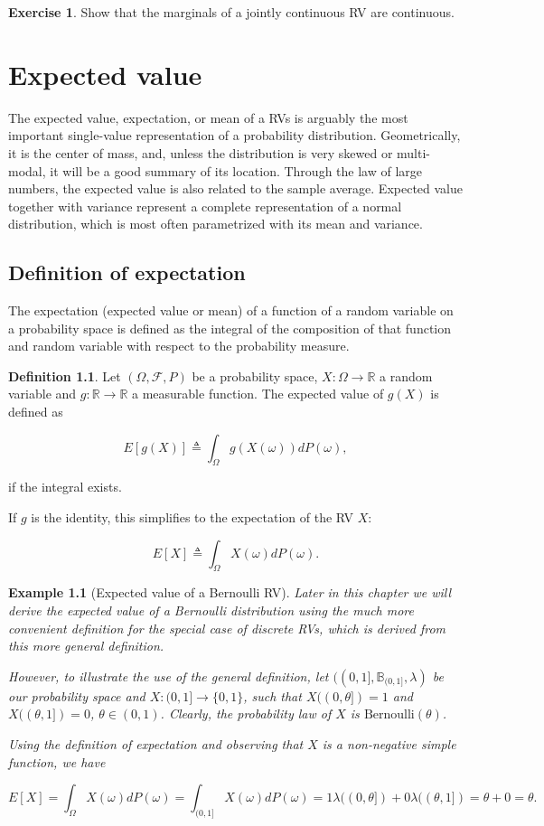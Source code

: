 \documentclass{book}
\theoremstyle{plain}%
\newtheorem{prototheorem}{Example}[section]
\newenvironment{cexample}
   {\colorlet{shadecolor}{gray!10}\begin{shaded}\begin{prototheorem}}
   {\end{prototheorem}\end{shaded}}
\theoremstyle{definition}
\newtheorem{definition}{Definition}[section]
\newtheorem{exercise}{Exercise}[chapter]
\newlength{\arrow}
\begin{document}
\begin{exercise}
Show that the marginals of a jointly continuous RV are continuous.
\end{exercise}

\chapter{Expected value}

The expected value, expectation, or mean of a RVs is arguably the most important single-value representation of a probability distribution. Geometrically, it is the center of mass, and, unless the distribution is very skewed or multi-modal, it will be a good summary of its location. Through the law of large numbers, the expected value is also related to the sample average. Expected value together with variance represent a complete representation of a normal distribution, which is most often parametrized with its mean and variance.

\section{Definition of expectation}

The expectation (expected value or mean) of a function of a random variable on a probability space is defined as the integral of the composition of that function and random variable with respect to the probability measure.

\begin{definition}
Let $(\Omega, \mathcal{F}, P)$ be a probability space, $X: \Omega \rightarrow \mathbb{R}$ a random variable and $g: \mathbb{R} \rightarrow \mathbb{R}$ a measurable function. The expected value of $g(X)$ is defined as

$$E[g(X)] \triangleq \int_{\Omega} g(X(\omega))dP(\omega),$$

if the integral exists.

If $g$ is the identity, this simplifies to the expectation of the RV $X$:

$$E[X] \triangleq \int_{\Omega} X(\omega)dP(\omega).$$
\end{definition}

\begin{cexample}[Expected value of a Bernoulli RV]
Later in this chapter we will derive the expected value of a Bernoulli distribution using the much more convenient definition for the special case of discrete RVs, which is derived from this more general definition.

However, to illustrate the use of the general definition, let $((0,1], \mathbb{B}_{(0,1]}, \lambda)$ be our probability space and $X: (0,1] \rightarrow \{0,1\}$, such that $X((0,\theta]) = 1$ and  $X((\theta, 1]) = 0$, $\theta \in (0,1)$. Clearly, the probability law of $X$ is $\text{Bernoulli}(\theta)$.

Using the definition of expectation and observing that $X$ is a non-negative simple function, we have

$$E[X] = \int_{\Omega} X(\omega)dP(\omega) = \int_{(0,1]} X(\omega)dP(\omega) = 1\lambda((0,\theta]) + 0\lambda((\theta,1]) = \theta + 0 = \theta.$$
\end{cexample}
\end{document}
